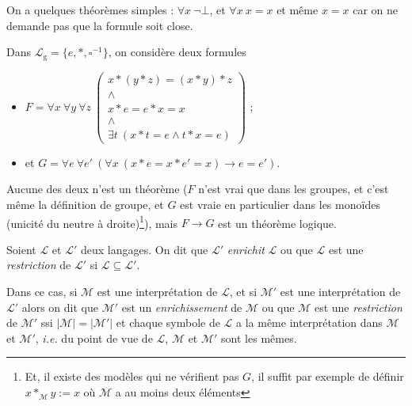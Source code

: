\documentclass[./main]{subfiles}
\begin{document}
  \begin{exm}
    On a quelques théorèmes simples :
    $\forall x \ \lnot \bot$, et $\forall x \ x = x$ et même $x = x$ car on ne demande pas que la formule soit close.

    Dans $\mathcal{L}_\mathrm{g} = \{e, *, \square^{-1}\}$, on considère deux formules 
    \begin{itemize}
      \item $F = \forall x \: \forall y \: \forall z \: \begin{pmatrix}
          x * (y * z) = (x * y) * z\\ \land\\ x * e = e * x = x\\ \land\\ \exists t \: (x * t = e \land t * x = e)
        \end{pmatrix} $ ;
      \item et $G = \forall e \: \forall e'\: (\forall x\: (x * e = x * e' = x) \to  e = e')$.
    \end{itemize}
    Aucune des deux n'est un théorème ($F$ n'est vrai que dans les groupes, et c'est même la définition de groupe, et $G$ est vraie en particulier dans les monoïdes (unicité du neutre à droite)\footnote{ Et, il existe des modèles qui ne vérifient pas $G$, il suffit par exemple de définir $x *_{\mathcal{M}} y := x$ où $\mathcal{M}$ a au moins deux éléments}), mais $F \to G$ est un théorème logique.
  \end{exm}

  \begin{defn}
    Soient $\mathcal{L}$ et $\mathcal{L}'$ deux langages. On dit que $\mathcal{L}'$ \textit{enrichit} $\mathcal{L}$ ou que $\mathcal{L}$ est une \textit{restriction}  de $\mathcal{L}'$  si $\mathcal{L} \subseteq \mathcal{L}'$.

    Dans ce cas, si $\mathcal{M}$ est une interprétation de $\mathcal{L}$, et si $\mathcal{M}'$ est une interprétation de $\mathcal{L}'$ alors on dit que $\mathcal{M}'$ est un \textit{enrichissement} de $\mathcal{M}$ ou que $\mathcal{M}$ est une \textit{restriction} de $\mathcal{M}'$ ssi $|\mathcal{M}| = |\mathcal{M}'|$ et chaque symbole de $\mathcal{L}$ a la même interprétation dans $\mathcal{M}$ et $\mathcal{M}'$, \textit{i.e.} du point de vue de $\mathcal{L}$, $\mathcal{M}$ et $\mathcal{M}'$ sont les mêmes.
  \end{defn}
\end{document}
